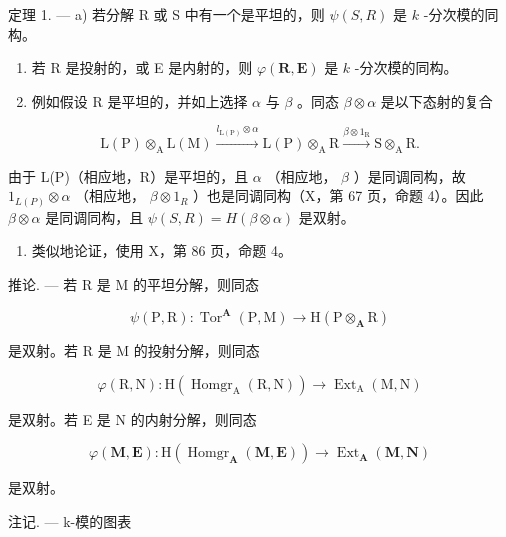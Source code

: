 定理 1. --- a) 若分解 R 或 S 中有一个是平坦的，则 \(\psi(S, R)\) 是 \(k\) -分次模的同构。

\begin{enumerate}
\def\labelenumi{\alph{enumi})}
\setcounter{enumi}{1}
\item
  若 R 是投射的，或 E 是内射的，则 \(\varphi(\mathbf{R},\mathbf{E})\) 是 \(k\) -分次模的同构。
\item
  例如假设 R 是平坦的，并如上选择 \(\alpha\) 与 \(\beta\) 。同态 \(\beta \otimes \alpha\) 是以下态射的复合
\end{enumerate}

\[
\mathrm{L} (\mathrm{P}) \otimes_ {\mathrm{A}} \mathrm{L} (\mathrm{M}) \xrightarrow {l _ {\mathrm{L} (\mathrm{P})} \otimes \alpha} \mathrm{L} (\mathrm{P}) \otimes_ {\mathrm{A}} \mathrm{R} \xrightarrow {\beta \otimes 1 _ {\mathrm{R}}} \mathrm{S} \otimes_ {\mathrm{A}} \mathrm{R}.
\]

由于 L(P)（相应地，R）是平坦的，且 \(\alpha\) （相应地， \(\beta\) ）是同调同构，故 \(1_{L(P)} \otimes \alpha\) （相应地， \(\beta \otimes 1_R\) ）也是同调同构（X，第 67 页，命题 4）。因此 \(\beta \otimes \alpha\) 是同调同构，且 \(\psi(S, R) = H(\beta \otimes \alpha)\) 是双射。

\begin{enumerate}
\def\labelenumi{\alph{enumi})}
\setcounter{enumi}{1}
\tightlist
\item
  类似地论证，使用 X，第 86 页，命题 4。
\end{enumerate}

推论. --- 若 R 是 M 的平坦分解，则同态

\[
\psi (\mathrm{P}, \mathrm{R}): \operatorname{Tor} ^ {\mathbf {A}} (\mathrm{P}, \mathrm{M}) \rightarrow \mathrm{H} (\mathrm{P} \otimes_ {\mathbf {A}} \mathrm{R})
\]

是双射。若 R 是 M 的投射分解，则同态

\[
\varphi (\mathrm{R}, \mathrm{N}): \mathrm{H} \left(\operatorname{Homgr} _ {\mathrm{A}} (\mathrm{R}, \mathrm{N})\right)\rightarrow \operatorname{Ext} _ {\mathrm{A}} (\mathrm{M}, \mathrm{N})
\]

是双射。若 E 是 N 的内射分解，则同态

\[
\varphi (\mathbf {M}, \mathbf {E}): \mathrm{H} \left(\operatorname{Homgr} _ {\mathbf {A}} (\mathbf {M}, \mathbf {E})\right)\rightarrow \operatorname{Ext} _ {\mathbf {A}} (\mathbf {M}, \mathbf {N})
\]

是双射。

注记. --- k-模的图表

